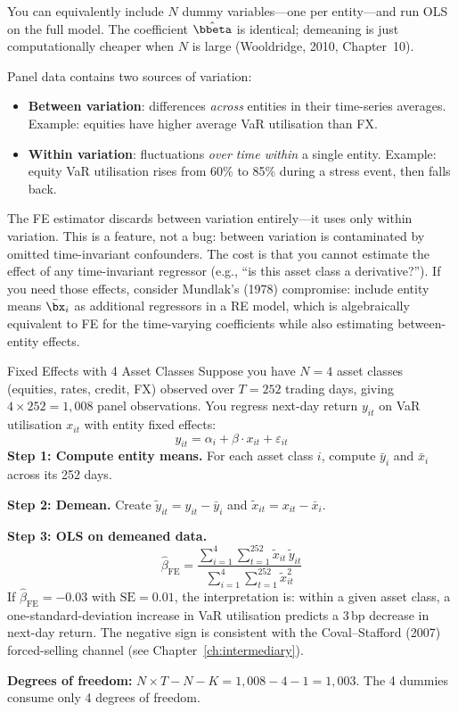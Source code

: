 You can equivalently include $N$ dummy variables---one per entity---and run OLS on the full model.
The coefficient $\hat{\bbeta}$ is identical; demeaning is just computationally cheaper when $N$ is large (Wooldridge, 2010, Chapter~10).

\begin{prereq}
Panel data contains two sources of variation:
\begin{itemize}[leftmargin=*]
  \item \textbf{Between variation}: differences \emph{across} entities in their time-series averages. Example: equities have higher average VaR utilisation than FX.
  \item \textbf{Within variation}: fluctuations \emph{over time within} a single entity. Example: equity VaR utilisation rises from 60\% to 85\% during a stress event, then falls back.
\end{itemize}
The FE estimator discards between variation entirely---it uses only within variation.
This is a feature, not a bug: between variation is contaminated by omitted time-invariant confounders.
The cost is that you cannot estimate the effect of any time-invariant regressor (e.g., ``is this asset class a derivative?'').
If you need those effects, consider Mundlak's (1978) compromise: include entity means $\bar{\bx}_i$ as additional regressors in a RE model, which is algebraically equivalent to FE for the time-varying coefficients while also estimating between-entity effects.
\end{prereq}

\begin{workedexample}{Fixed Effects with 4 Asset Classes}
Suppose you have $N = 4$ asset classes (equities, rates, credit, FX) observed over $T = 252$ trading days, giving $4 \times 252 = 1{,}008$ panel observations.
You regress next-day return $y_{it}$ on VaR utilisation $x_{it}$ with entity fixed effects:
\[
  y_{it} = \alpha_i + \beta \cdot x_{it} + \varepsilon_{it}
\]
\textbf{Step 1: Compute entity means.}
For each asset class $i$, compute $\bar{y}_i$ and $\bar{x}_i$ across its 252 days.

\textbf{Step 2: Demean.}
Create $\tilde{y}_{it} = y_{it} - \bar{y}_i$ and $\tilde{x}_{it} = x_{it} - \bar{x}_i$.

\textbf{Step 3: OLS on demeaned data.}
\[
  \hat{\beta}_{\text{FE}} = \frac{\sum_{i=1}^{4}\sum_{t=1}^{252} \tilde{x}_{it}\,\tilde{y}_{it}}{\sum_{i=1}^{4}\sum_{t=1}^{252} \tilde{x}_{it}^2}
\]
If $\hat{\beta}_{\text{FE}} = -0.03$ with $\text{SE} = 0.01$, the interpretation is: within a given asset class, a one-standard-deviation increase in VaR utilisation predicts a 3\,bp decrease in next-day return.
The negative sign is consistent with the Coval--Stafford (2007) forced-selling channel (see Chapter~\ref{ch:intermediary}).

\textbf{Degrees of freedom:} $N \times T - N - K = 1{,}008 - 4 - 1 = 1{,}003$.
The 4 dummies consume only 4 degrees of freedom.
\end{workedexample}


